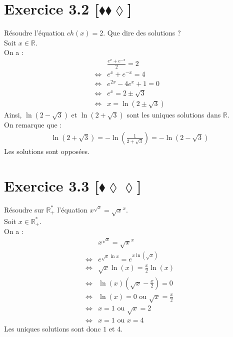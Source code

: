 \documentclass[10pt]{article}
\begin{document}
\section*{Exercice 3.2 [$\blacklozenge\blacklozenge\lozenge$]}
\begin{tcolorbox}[enhanced, width=6in, center, size=fbox, fontupper=\large, drop shadow southwest]
    Résoudre l'équation $ch(x)=2$. Que dire des solutions ?\\
    Soit $x\in\mathbb{R}$.\\
    On a :
    \begin{align*}
        &\frac{e^x+e^{-x}}{2}=2\\
        \iff&e^x+e^{-x}=4\\
        \iff&e^{2x}-4e^x+1=0\\
        \iff&e^x=2\pm\sqrt{3}\\
        \iff&x=\ln(2\pm\sqrt{3})
    \end{align*}
    Ainsi, $\ln(2-\sqrt{3})$ et $\ln(2+\sqrt{3})$ sont les uniques solutions dans $\mathbb{R}$.\\
    On remarque que :
    \begin{align*}
        \ln(2+\sqrt{3})=-\ln\left(\frac{1}{2+\sqrt{3}}\right)=-\ln\left(2-\sqrt{3}\right)
    \end{align*}
    Les solutions sont opposées.
\end{tcolorbox}

\section*{Exercice 3.3 [$\blacklozenge\lozenge\lozenge$]}
\begin{tcolorbox}[enhanced, width=6in, center, size=fbox, fontupper=\large, drop shadow southwest]
    Résoudre sur $\mathbb{R}^*_+$ l'équation $x^{\sqrt{x}}=\sqrt{x}^x$.\\
    Soit $x\in\mathbb{R}^*_+$.\\
    On a :
    \begin{align*}
        &x^{\sqrt{x}}=\sqrt{x}^x\\
        \iff&e^{\sqrt{x}\ln{x}}=e^{x\ln(\sqrt{x})}\\
        \iff&\sqrt{x}\ln(x)=\frac{x}{2}\ln(x)\\
        \iff&\ln(x)(\sqrt{x}-\frac{x}{2})=0\\
        \iff&\ln(x)=0\text{ ou } \sqrt{x}=\frac{x}{2}\\
        \iff&x=1\text{ ou }\sqrt{x}=2\\
        \iff&x=1\text{ ou }x=4
    \end{align*}
    Les uniques solutions sont donc $1$ et $4$.
\end{tcolorbox}
\end{document}
